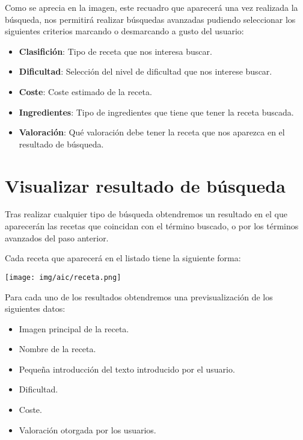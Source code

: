 \documentclass{\ClassPath/viu-tfm-template}
\begin{document}
Como se aprecia en la imagen, este recuadro que aparecerá una vez realizada la búsqueda, nos permitirá realizar búsquedas avanzadas pudiendo seleccionar los siguientes criterios marcando o desmarcando a gusto del usuario:

\begin{itemize}
    \item \textbf{Clasifición}: Tipo de receta que nos interesa buscar.
    \item \textbf{Dificultad}: Selección del nivel de dificultad que nos interese buscar.
    \item \textbf{Coste}: Coste estimado de la receta.
    \item \textbf{Ingredientes}: Tipo de ingredientes que tiene que tener la receta buscada.
    \item \textbf{Valoración}: Qué valoración debe tener la receta que nos aparezca en el resultado de búsqueda.
\end{itemize}


\section{Visualizar resultado de búsqueda}

Tras realizar cualquier tipo de búsqueda obtendremos un resultado en el que aparecerán las recetas que coincidan con el término buscado, o por los términos avanzados del paso anterior.

Cada receta que aparecerá en el listado tiene la siguiente forma:


\begin{center}
    \vspace{-10pt}
    \texttt{[image: img/aic/receta.png]}
    \vspace{-20pt}
\end{center}

Para cada uno de los resultados obtendremos una previsualización de los siguientes datos:

\vspace{-1em}
\begin{itemize}
    \item Imagen principal de la receta.
    \item Nombre de la receta.
    \item Pequeña introducción del texto introducido por el usuario.
    \item Dificultad.
    \item Coste.
    \item Valoración otorgada por los usuarios.
\end{itemize}
\vspace{-0.8em}
\end{document}

